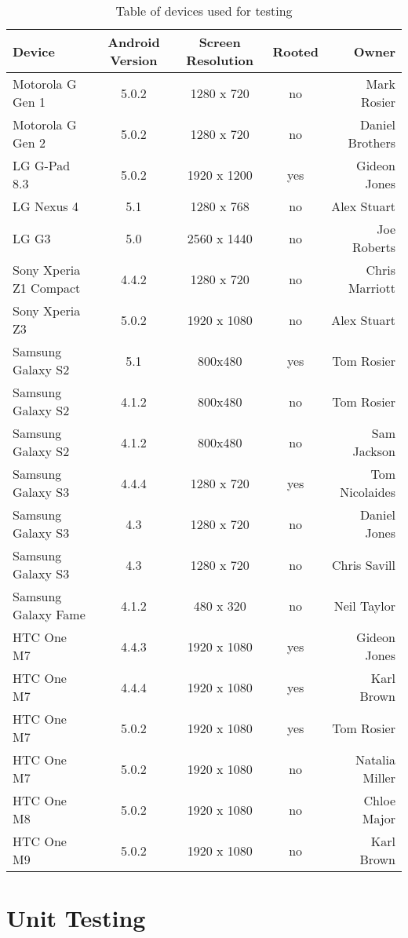 \begin{center}
\begin{table}
\begin{tabular}{ l c c c r }
\hline
Device & Android Version & Screen Resolution & Rooted & Owner \\
\hline
Motorola G Gen 1 & 5.0.2 & 1280 x 720 & no & Mark Rosier \\
Motorola G Gen 2 & 5.0.2 & 1280 x 720 & no & Daniel Brothers \\ 
\hline
LG G-Pad 8.3 & 5.0.2 & 1920 x 1200 & yes & Gideon Jones \\
LG Nexus 4 & 5.1 & 1280 x 768 & no & Alex Stuart \\
LG G3 & 5.0 & 2560 x 1440 & no & Joe Roberts \\
\hline
Sony Xperia Z1 Compact & 4.4.2 & 1280 x 720 & no & Chris Marriott \\ 
Sony Xperia Z3 & 5.0.2 & 1920 x 1080 & no & Alex Stuart \\
\hline
Samsung Galaxy S2 & 5.1 & 800x480 & yes & Tom Rosier \\
Samsung Galaxy S2 & 4.1.2 & 800x480 & no & Tom Rosier \\
Samsung Galaxy S2 & 4.1.2 & 800x480 & no & Sam Jackson \\
Samsung Galaxy S3 & 4.4.4 & 1280 x 720 & yes & Tom Nicolaides \\
Samsung Galaxy S3 & 4.3 & 1280 x 720 & no & Daniel Jones \\
Samsung Galaxy S3 & 4.3 & 1280 x 720 & no & Chris Savill \\
Samsung Galaxy Fame & 4.1.2 & 480 x 320 & no & Neil Taylor \\
\hline
HTC One M7 & 4.4.3 & 1920 x 1080 & yes & Gideon Jones \\
HTC One M7 & 4.4.4 & 1920 x 1080 & yes & Karl Brown \\
HTC One M7 & 5.0.2 & 1920 x 1080 & yes & Tom Rosier \\
HTC One M7 & 5.0.2 & 1920 x 1080 & no & Natalia Miller \\
HTC One M8 & 5.0.2 & 1920 x 1080 & no & Chloe Major \\
HTC One M9 & 5.0.2 & 1920 x 1080 & no & Karl Brown \\
\hline
\end{tabular}
\caption{Table of devices used for testing}
\label{table:device_table}
\end{table}
\end{center}

\section{Unit Testing}

